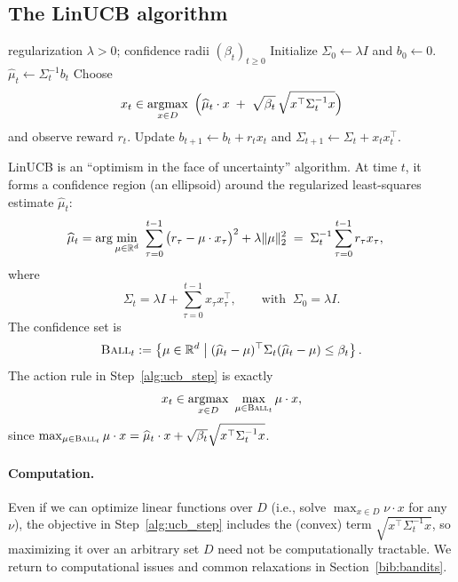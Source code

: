\subsection{The LinUCB algorithm}

\begin{algorithm}[!t]
\begin{algorithmic}[1]
\Require regularization $\lambda>0$; confidence radii $(\beta_t)_{t\ge 0}$
\State Initialize $\Sigma_0 \gets \lambda I$ and $b_0 \gets 0$.
    \State $\widehat{\mu}_t \gets \Sigma_t^{-1} b_t$
    \State \label{alg:ucb_step} Choose
    \[
    x_t \in \operatorname*{argmax}_{x\in D}\ \Big( \widehat{\mu}_t\cdot x \;+\; \sqrt{\beta_t}\,\sqrt{x^\top \Sigma_t^{-1}x}\Big)
    \]
    and observe reward $r_t$.
    \State Update $b_{t+1} \gets b_t + r_t x_t$ and $\Sigma_{t+1} \gets \Sigma_t + x_t x_t^\top$.
\EndFor
\end{algorithmic}
\caption{LinUCB (linear bandits with optimistic action selection)}
\label{alg:linUCB}
\end{algorithm}

LinUCB is an ``optimism in the face of uncertainty'' algorithm.
At time $t$, it forms a confidence region (an ellipsoid) around the regularized
least-squares estimate $\widehat{\mu}_t$:
\begin{align*}
\widehat{\mu}_t
&= \arg\min_{\mu\in\mathbb{R}^d}\ \sum_{\tau=0}^{t-1}\big(r_\tau - \mu\cdot x_\tau\big)^2 + \lambda\|\mu\|_2^2
\;=\; \Sigma_t^{-1}\sum_{\tau=0}^{t-1} r_\tau x_\tau,
\end{align*}
where
\[
\Sigma_t = \lambda I + \sum_{\tau=0}^{t-1} x_\tau x_\tau^\top,
\qquad \text{with }\ \Sigma_0=\lambda I.
\]
The confidence set is
\begin{align}\label{eq:ball}
\textsc{Ball}_{t} := \left\{ \mu\in\mathbb{R}^d \;\middle|\;
(\widehat{\mu}_t-\mu)^\top \Sigma_t(\widehat{\mu}_t-\mu) \le \beta_t \right\}.
\end{align}
The action rule in Step~\ref{alg:ucb_step} is exactly
\[
x_t \in \operatorname*{argmax}_{x\in D}\ \max_{\mu\in \textsc{Ball}_t} \mu\cdot x,
\]
since $\max_{\mu\in\textsc{Ball}_t}\mu\cdot x = \widehat{\mu}_t\cdot x + \sqrt{\beta_t}\sqrt{x^\top\Sigma_t^{-1}x}$.

\paragraph{Computation.}
Even if we can optimize linear functions over $D$ (i.e., solve $\max_{x\in D}\nu\cdot x$
for any $\nu$), the objective in Step~\ref{alg:ucb_step} includes the (convex) term
$\sqrt{x^\top\Sigma_t^{-1}x}$, so maximizing it over an arbitrary set $D$ need not
be computationally tractable. We return to computational issues and common relaxations
in Section~\ref{bib:bandits}.

